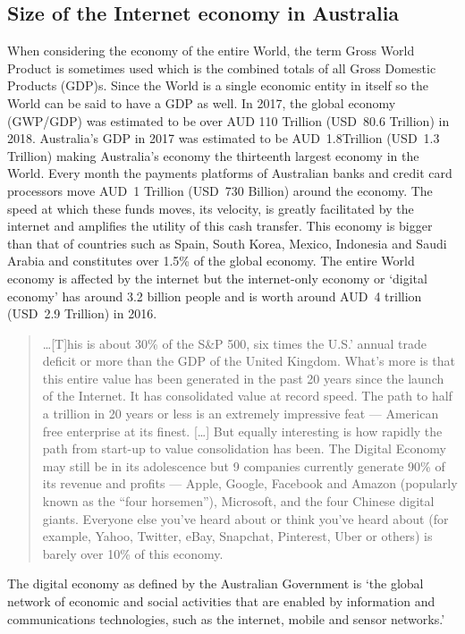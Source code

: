 \subsection{Size of the Internet economy in Australia}
When considering the economy of the entire World, the term Gross World Product is sometimes used which is the combined totals of all Gross Domestic Products (GDP)s. Since the World is a single economic entity in itself so the World can be said to have a GDP as well.  In 2017, the global economy (GWP/GDP) was estimated to be over AUD 110 Trillion (USD~80.6 Trillion) in 2018.  Australia's GDP in 2017 was estimated to be AUD~1.8Trillion  (USD~1.3 Trillion) making Australia's economy the thirteenth largest economy in the World\cite{RefWorks:448}. Every month the payments platforms of Australian banks and credit card processors move AUD~1 Trillion (USD~730 Billion) around the economy\cite[p29]{CAFS2018}. The speed at which these funds moves, its velocity, is greatly facilitated by the internet and amplifies the utility of this cash transfer. This economy is bigger than that of countries such as Spain, South Korea, Mexico, Indonesia and Saudi Arabia and constitutes over 1.5\% of the global economy.\cite{RefWorks:293}
The entire World economy is affected by the internet but the internet-only economy or `digital economy' has around 3.2 billion people and is worth around AUD~4 trillion (USD~2.9 Trillion) in 2016. 
\begin{quotation}
\ldots[T]his is about 30\% of the S\&P 500, six times the U.S.' annual trade deficit or more than the GDP of the United Kingdom.  What's more is that this entire value has been generated in the past 20 years since the launch of the Internet.
It has consolidated value at record speed. The path to half a trillion in 20 years or less is an extremely impressive feat --- American free enterprise at its finest.  [\ldots]  But equally interesting is how rapidly the path from start-up to value consolidation has been.  The Digital Economy may still be in its adolescence but 9 companies currently generate 90\% of its revenue and profits --- Apple, Google, Facebook and Amazon (popularly known as the ``four horsemen''), Microsoft, and the four Chinese digital giants.  Everyone else you've heard about or think you've heard about (for example, Yahoo, Twitter, eBay, Snapchat, Pinterest, Uber or others) is barely over 10\% of this economy.\cite{RefWorks:295}
\end{quotation}


The digital economy as defined by the Australian Government is `the global network of economic and social activities that are enabled by information and communications technologies, such as the internet, mobile and sensor networks.'\cite[p9]{RefWorks:274} 

